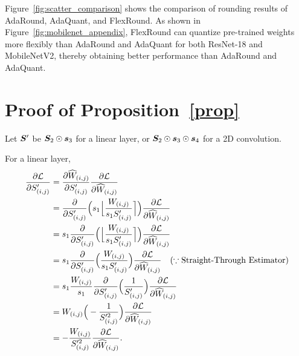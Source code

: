 \documentclass{article}
\theoremstyle{plain}
\theoremstyle{definition}
\theoremstyle{remark}
\begin{document}
Figure~\ref{fig:scatter_comparison} shows the comparison of rounding results of AdaRound, AdaQuant, and FlexRound. As shown in Figure~\ref{fig:mobilenet_appendix}, FlexRound can quantize pre-trained weights more flexibly than AdaRound and AdaQuant for both ResNet-18 and MobileNetV2, thereby obtaining better performance than AdaRound and AdaQuant.  %

\newpage

\section{Proof of Proposition~\ref{prop}}\label{appendix:proof}
Let ${\bm{S}}'$ be ${\bm{S}}_2 \odot {\bm{s}}_3$ for a linear layer, or ${\bm{S}}_2 \odot {\bm{s}}_3 \odot {\bm{s}}_4$ for a 2D convolution. 

For a linear layer,
\begin{align*}
    {{\partial\mathcal{L}} \over {\partial S'_{(i, j)}}} &= {{\partial \widehat{W}_{(i, j)}} \over {\partial S'_{(i, j)}}} {{\partial\mathcal{L}} \over {\partial \widehat{W}_{(i, j)}}} \\ 
    &= {{\partial \over {\partial S'_{(i, j)}}}}\Big(s_1 \Big\lfloor {W_{(i, j)} \over {s_1 S'_{(i, j)}}} \Big\rceil \Big) {{\partial\mathcal{L}} \over {\partial \widehat{W}_{(i, j)}}} \\
    &= s_1 {{\partial \over {\partial S'_{(i, j)}}}}\Big(\Big\lfloor {W_{(i, j)} \over {s_1 S'_{(i, j)}}} \Big\rceil \Big) {{\partial\mathcal{L}} \over {\partial \widehat{W}_{(i, j)}}} \\
    &= s_1 {{\partial \over {\partial S'_{(i, j)}}}} \Big( {W_{(i, j)} \over {s_1 S'_{(i, j)}}} \Big) {{\partial\mathcal{L}} \over {\partial \widehat{W}_{(i, j)}}} \quad (\because \text{Straight-Through Estimator}) \\
    &= s_1 {W_{(i, j)} \over s_1} {{\partial \over {\partial S'_{(i, j)}}}} \Big( {1 \over {S'_{(i, j)}}} \Big) {{\partial\mathcal{L}} \over {\partial \widehat{W}_{(i, j)}}} \\
    &= W_{(i, j)} \Big( - {1 \over {S'^2_{(i, j)}}} \Big) {{\partial\mathcal{L}} \over {\partial \widehat{W}_{(i, j)}}} \\ 
    &= - {W_{(i, j)} \over {S'^2_{(i, j)}}} {{\partial\mathcal{L}} \over {\partial \widehat{W}_{(i, j)}}}.
\end{align*}
\end{document}
